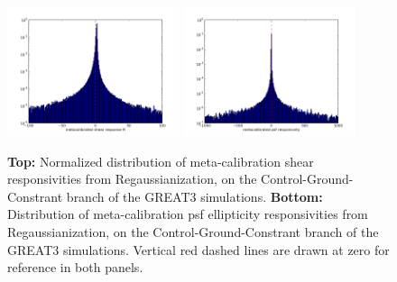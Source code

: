\documentclass[iop]{emulateapj}
\begin{document}
\begin{figure}
\includegraphics[width=0.45\textwidth]{./Plots/regauss-r-histogram.png}
\includegraphics[width=0.45\textwidth]{./Plots/regauss-a-histogram.png}
\caption{{\bf Top:} Normalized distribution of meta-calibration shear
  responsivities from Regaussianization, on the
  Control-Ground-Constrant branch of the GREAT3 simulations.  {\bf
    Bottom:} Distribution of meta-calibration psf ellipticity
  responsivities from Regaussianization, on the
  Control-Ground-Constrant branch of the GREAT3 simulations. Vertical
  red dashed lines are drawn at zero for reference in both panels.}
\label{fig:calibhist}
\end{figure}
\end{document}
